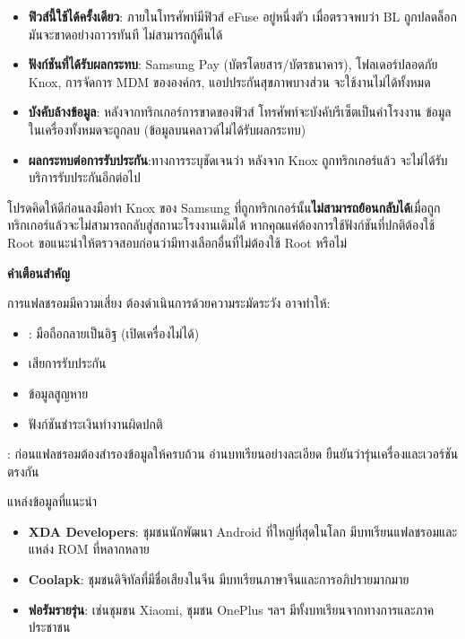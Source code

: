 \begin{itemize}
  \item \textbf{ฟิวส์นี้ใช้ได้ครั้งเดียว}: ภายในโทรศัพท์มีฟิวส์ eFuse อยู่หนึ่งตัว เมื่อตรวจพบว่า BL ถูกปลดล็อก มันจะขาดอย่างถาวรทันที ไม่สามารถกู้คืนได้
  \item \textbf{ฟังก์ชันที่ได้รับผลกระทบ}: Samsung Pay (บัตรโดยสาร/บัตรธนาคาร), โฟลเดอร์ปลอดภัย Knox, การจัดการ MDM ขององค์กร, แอปประกันสุขภาพบางส่วน จะใช้งานไม่ได้ทั้งหมด
  \item \textbf{บังคับล้างข้อมูล}: หลังจากทริกเกอร์การขาดของฟิวส์ โทรศัพท์จะบังคับรีเซ็ตเป็นค่าโรงงาน ข้อมูลในเครื่องทั้งหมดจะถูกลบ (ข้อมูลบนคลาวด์ไม่ได้รับผลกระทบ)
  \item \textbf{ผลกระทบต่อการรับประกัน}:ทางการระบุชัดเจนว่า หลังจาก Knox ถูกทริกเกอร์แล้ว จะไม่ได้รับบริการรับประกันอีกต่อไป
\end{itemize}

\begin{tcbwarn}{โปรดคิดให้ดีก่อนลงมือทำ}
Knox ของ Samsung ที่ถูกทริกเกอร์นั้น\textbf{ไม่สามารถย้อนกลับได้}เมื่อถูกทริกเกอร์แล้วจะไม่สามารถกลับสู่สถานะโรงงานเดิมได้ หากคุณแค่ต้องการใช้ฟังก์ชันที่ปกติต้องใช้ Root ขอแนะนำให้ตรวจสอบก่อนว่ามีทางเลือกอื่นที่ไม่ต้องใช้ Root หรือไม่

\end{tcbwarn}

\textbf{คำเตือนสำคัญ}\par

การแฟลชรอมมีความเสี่ยง ต้องดำเนินการด้วยความระมัดระวัง อาจทำให้:

\begin{itemize}
  \item : มือถือกลายเป็นอิฐ (เปิดเครื่องไม่ได้)
  \item เสียการรับประกัน
  \item ข้อมูลสูญหาย
  \item ฟังก์ชันชำระเงินทำงานผิดปกติ
\end{itemize}

: ก่อนแฟลชรอมต้องสำรองข้อมูลให้ครบถ้วน อ่านบทเรียนอย่างละเอียด ยืนยันว่ารุ่นเครื่องและเวอร์ชันตรงกัน

\begin{tcbinfo}{แหล่งข้อมูลที่แนะนำ}
\begin{itemize}
  \item \textbf{XDA Developers}: ชุมชนนักพัฒนา Android ที่ใหญ่ที่สุดในโลก มีบทเรียนแฟลชรอมและแหล่ง ROM ที่หลากหลาย
  \item \textbf{Coolapk}: ชุมชนดิจิทัลที่มีชื่อเสียงในจีน มีบทเรียนภาษาจีนและการอภิปรายมากมาย
  \item \textbf{ฟอรัมรายรุ่น}: เช่นชุมชน Xiaomi, ชุมชน OnePlus ฯลฯ มีทั้งบทเรียนจากทางการและภาคประชาชน
\end{itemize}

\end{tcbinfo}

